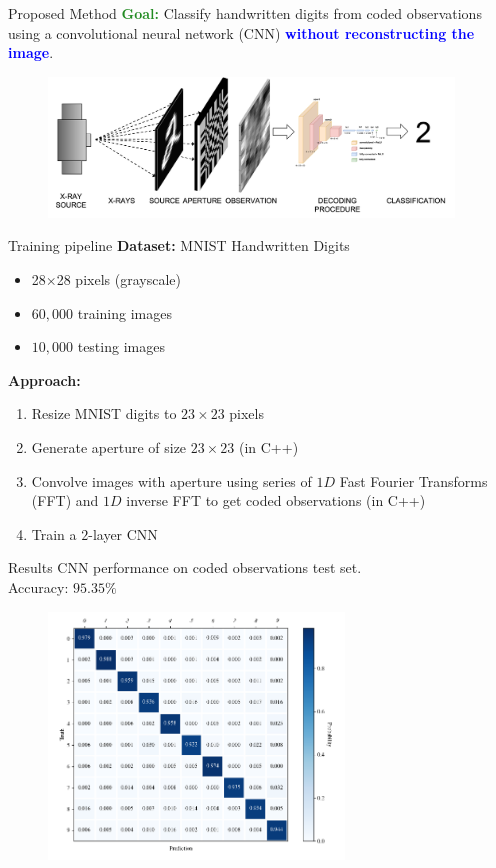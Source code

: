 \documentclass[10pt, t]{beamer}
\begin{document}
\begin{frame}{Proposed Method}
	\textcolor{forestgreen}{\textbf{Goal:}} Classify handwritten digits from coded observations using a convolutional neural network (CNN) \textcolor{blue}{\textbf{without reconstructing the image}}.
	\bigskip
		\begin{figure}
		\includegraphics[width = 0.96\textwidth]{images/task_diagram.png}
	\end{figure}
\end{frame}
\begin{frame}{Training pipeline}
	\textbf{Dataset:} MNIST Handwritten Digits 
		\begin{itemize}
		\item 28$\times$28 pixels (grayscale)
		\item $60,000$ training images
		\item $10,000$ testing images 
	\end{itemize}
    \medskip
	\pause
	\textbf{Approach:}
	\begin{enumerate}
		\item Resize MNIST digits to $23 \times 23$ pixels \pause
		\item Generate aperture of size $23 \times 23$  (in C++)\pause
		\item Convolve images with aperture using series of $1D$ Fast Fourier Transforms (FFT) and $1D$ inverse FFT to get coded observations (in C++) \pause
		\item Train  a $2$-layer CNN 
	\end{enumerate}
	
\end{frame}
    
\begin{frame}{Results}
	CNN performance on coded observations test set.\\
	Accuracy: $\mathbf{95.35\%}$
		\begin{figure}
		\includegraphics[width = 0.7\textwidth]{images/conf_mat.png}
	\end{figure}
\end{frame}
\end{document}
